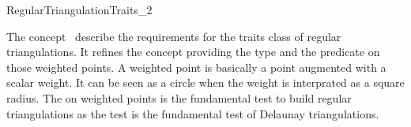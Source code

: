 

\begin{ccRefConcept}{RegularTriangulationTraits_2}

\ccDefinition
  
The concept \ccRefName\ describe the requirements
for the traits class of regular triangulations. It refines  the 
concept  
providing  the  type
 and the   predicate on those 
weighted points.
A weighted point is basically 
a point augmented with a scalar weight. It can be seen as a circle
when the weight is interprated as a square radius.
The   on weighted points
is the fundamental test to build regular triangulations 
as  the  test is the fundamental test
of Delaunay triangulations.


\ccRefines
{}

\ccTypes
{}
\ccGlue    
{} 


\end{ccRefConcept}
